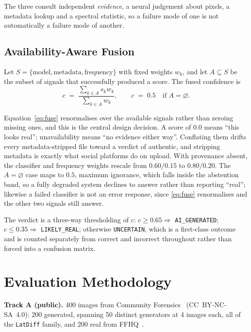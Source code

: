 \documentclass[conference]{IEEEtran}
\begin{document}
The three consult independent \emph{evidence}, a neural judgement about pixels,
a metadata lookup and a spectral statistic, so a failure mode of one is not
automatically a failure mode of another.

\subsection{Availability-Aware Fusion}
\label{sec:fusion}

Let $S=\{\text{model},\text{metadata},\text{frequency}\}$ with fixed weights
$w_k$, and let $A \subseteq S$ be the subset of signals that successfully
produced a score. The fused confidence is
\begin{equation}
c \;=\; \frac{\sum_{k \in A} s_k w_k}{\sum_{k \in A} w_k},
\qquad
c \;=\; 0.5 \quad\text{if } A = \varnothing .
\label{eq:fuse}
\end{equation}

Equation~\eqref{eq:fuse} renormalises over the available signals rather than
zeroing missing ones, and this is the central design decision. A score of
$0.0$ means ``this looks real''; unavailability means ``no evidence either
way''. Conflating them drifts every metadata-stripped file toward a verdict of
authentic, and stripping metadata is exactly what social platforms do on
upload. With provenance absent, the classifier and frequency weights rescale
from $0.60/0.15$ to $0.80/0.20$. The $A=\varnothing$ case maps to $0.5$,
maximum ignorance, which falls inside the abstention band, so a fully degraded
system declines to answer rather than reporting ``real''; likewise a failed
classifier is not an error response, since \eqref{eq:fuse} renormalises and the
other two signals still answer.

The verdict is a three-way thresholding of $c$:
$c \ge 0.65 \Rightarrow$ \texttt{AI\_GENERATED};
$c \le 0.35 \Rightarrow$ \texttt{LIKELY\_REAL}; otherwise
\texttt{UNCERTAIN}, which is a first-class outcome and is counted separately
from correct and incorrect throughout rather than forced into a confusion
matrix.

\section{Evaluation Methodology}
\label{sec:method}

\textbf{Track A (public).} 400 images from Community Forensics~\cite{park2025}
(CC~BY-NC-SA~4.0): 200 generated, spanning 50 distinct generators at 4 images
each, all of the \texttt{LatDiff} family, and 200 real from
FFHQ~\cite{karras2019}.
\end{document}

